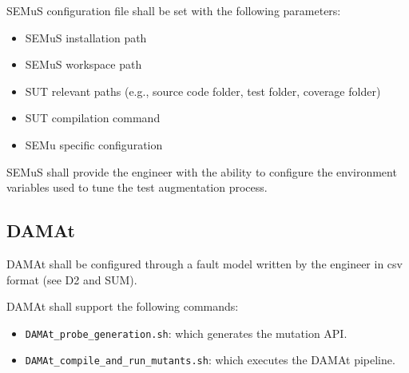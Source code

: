\RQ{} SEMuS configuration file shall be set with the following parameters:
	\begin{itemize}
		\item SEMuS installation path
		\item SEMuS workspace path
		\item SUT relevant paths (e.g., source code folder, test folder, coverage folder)
		\item SUT compilation command
		\item SEMu specific configuration
	\end{itemize}


\RQ{} SEMuS shall provide the engineer with the ability to configure the environment variables used to tune the test augmentation process.

\subsection{DAMAt}
\RQ{} DAMAt shall be configured through a fault model written by the engineer in csv format (see D2 and SUM).

\RQ{} DAMAt shall support the following commands:
	\begin{itemize}
		\item \texttt{DAMAt\_probe\_generation.sh}: which generates the mutation API.
		\item \texttt{DAMAt\_compile\_and\_run\_mutants.sh}: which executes the DAMAt pipeline.
\end{itemize}

